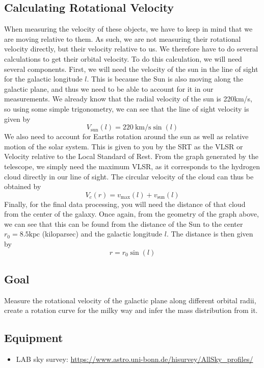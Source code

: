 \subsection{Calculating Rotational Velocity}
When measuring the velocity of these objects, we have to keep in mind that we are moving relative to them. As such, we are not measuring their rotational velocity directly, but their velocity relative to us. We therefore have to do several calculations to get their orbital velocity. To do this calculation, we will need several components. First, we will need the velocity of the sun in the line of sight for the galactic longitude $l$. This is because the Sun is also moving along the galactic plane, and thus we need to be able to account for it in our measurements. We already know that the radial velocity of the sun is 220km/s, so using some simple trigonometry, we can see that the line of sight velocity is given by $$V_\textrm{sun}(l) = 220\:\mathrm{km}/\mathrm{s}\sin(l)$$ We also need to account for Earths rotation around the sun as well as relative motion of the solar system. This is given to you by the SRT as the VLSR or Velocity relative to the Local Standard of Rest. From the graph generated by the telescope, we simply need the maximum VLSR, as it corresponds to the hydrogen cloud directly in our line of sight. The circular velocity of the cloud can thus be obtained by  $$V_c(r) = v_\textrm{max} (l) + v_\textrm{sun}(l)$$ Finally, for the final data processing, you will need the distance of that cloud from the center of the galaxy. Once again, from the geometry of the graph above, we can see that this can be found from the distance of the Sun to the center $r_0 = 8.5\textrm{kpc}$ (kiloparsec) and the galactic longitude $l$. The distance is then given by $$r = r_0 \sin(l)$$





\subsection{Goal}
Measure the rotational velocity of the galactic plane along different orbital radii, create a rotation curve for the milky way and infer the mass distribution from it.
\subsection{Equipment}
\begin{itemize}
	\item LAB sky survey: \url{https://www.astro.uni-bonn.de/hisurvey/AllSky_profiles/}
\end{itemize}


